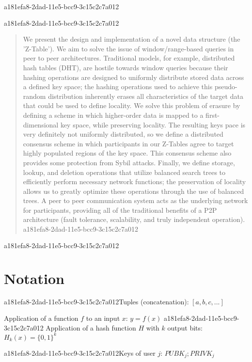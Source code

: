 \documentclass[12pt]{article}
\begin{document}
a181efa8-2dad-11e5-bcc9-3c15c2c7a012
\maketitle

a181efa8-2dad-11e5-bcc9-3c15c2c7a012\begin{abstract}
We present the design and implementation of a novel data structure (the 'Z-Table'). We aim to solve the issue of window/range-based queries in peer to peer architectures. Traditional models, for example,  distributed hash tables (DHT), are hostile towards window queries because their hashing operations are designed to uniformly distribute stored data across a defined key space; the hashing operations used to achieve this pseudo-random distribution inherently erases all characteristics of the target data that could be used to define locality. We solve this problem of erasure by defining a scheme in which higher-order data is mapped to a first-dimensional key space, while preserving locality. The resulting keys pace is very definitely not uniformly distributed, so we define a distributed consensus scheme in which participants in our Z-Tables agree to target highly populated regions of the key space. This consensus scheme also provides some protection from Sybil attacks. Finally, we define storage, lookup, and deletion operations that utilize balanced search trees to efficiently perform necessary network functions; the preservation of locality allows us to greatly optimize these operations through the use of balanced trees. A peer to peer communication system acts as the underlying network for participants, providing all of the traditional benefits of a P2P architecture (fault tolerance, scalability, and truly independent operation).
a181efa8-2dad-11e5-bcc9-3c15c2c7a012\end{abstract}

a181efa8-2dad-11e5-bcc9-3c15c2c7a012\section{Notation}

a181efa8-2dad-11e5-bcc9-3c15c2c7a012Tuples (concatenation): $[a,b,c,...]$

Application of a function $f$ to an input $x$: $y=f(x)$
a181efa8-2dad-11e5-bcc9-3c15c2c7a012
Application of a hash function $H$ with $k$ output bits: $H_{k}(x) = \{0,1\}^k$

a181efa8-2dad-11e5-bcc9-3c15c2c7a012Keys of user $j$: $ PUBK_j; PRIVK_j $
\end{document}
